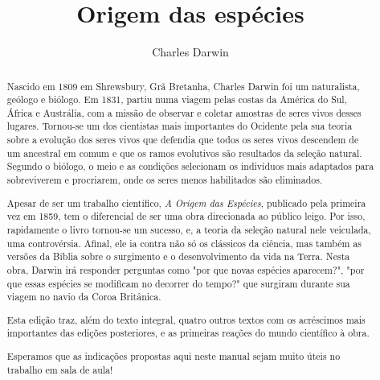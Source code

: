 \documentclass[12pt]{extarticle}
\begin{document}
\newcommand{\AutorLivro}{Charles Darwin}
\newcommand{\TituloLivro}{Origem das espécies}
\newcommand{\Tema}{História da ciência}
\newcommand{\Genero}{Tratado científico}
\newcommand{\imagemCapa}{./images/PNLD0060-01.png}
\newcommand{\issnppub}{---}
\newcommand{\issnepub}{---}
\newcommand{\colaborador}{\textbf{Fulano de Tal} é uma pessoa incrível e vai fazer um bom serviço.}


\title{\TituloLivro}
\author{\AutorLivro}
\def\authornotes{\colaborador}

\date{}
\maketitle



\baselineskip\par



\begin{abstract} 

Nascido em 1809 em Shrewsbury, Grã Bretanha, Charles Darwin foi um naturalista,
geólogo e biólogo. Em 1831, partiu numa viagem pelas costas da América do Sul,
África e Austrália, com a missão de observar e coletar amostras de seres vivos
desses lugares. Tornou-se um dos cientistas mais importantes do Ocidente pela
sua teoria sobre a evolução dos seres vivos que defendia que todos os seres
vivos descendem de um ancestral em comum e que os ramos evolutivos são
resultados da seleção natural. Segundo o biólogo, o meio e as condições
selecionam os indivíduos mais adaptados para sobreviverem e procriarem, onde os
seres menos habilitados são eliminados.

Apesar de ser um trabalho científico, \emph{A Origem das Espécies}, publicado
pela primeira vez em 1859, tem o diferencial de ser uma obra direcionada ao
público leigo.  Por isso, rapidamente o livro tornou-se um sucesso, e, a teoria
da seleção natural nele veiculada, uma controvérsia. Afinal, ele ia contra não
só os clássicos da ciência, mas também as versões da Bíblia sobre o surgimento
e o desenvolvimento da vida na Terra.  Nesta obra, Darwin irá responder
perguntas como "por que novas espécies aparecem?", "por que essas espécies se
modificam no decorrer do tempo?" que surgiram durante sua viagem no navio da
Coroa Britânica. 

Esta edição traz, além do texto integral, quatro outros textos com os
acréscimos mais importantes das edições posteriores, e as primeiras reações do
mundo científico à obra. 

Esperamos que as indicações propostas aqui neste manual sejam muito úteis no
trabalho em sala de aula!

\end{abstract}
\end{document}
